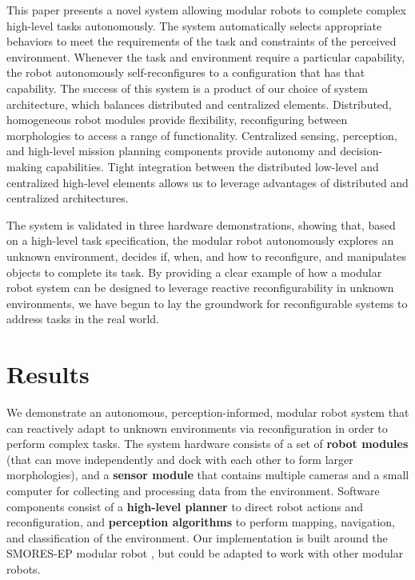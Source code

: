\documentclass[12pt]{article}
\begin{document}
This paper presents a novel system allowing modular robots to complete complex high-level tasks autonomously.  The system automatically selects appropriate behaviors to meet the requirements of the task and constraints of the perceived environment.  Whenever the task and environment require a particular capability, the robot autonomously self-reconfigures to a configuration that has that capability.
The success of this system is a product of our choice of system architecture, which balances distributed and centralized elements.  Distributed, homogeneous robot modules provide flexibility, reconfiguring between morphologies to access a range of functionality.  Centralized sensing, perception, and high-level mission planning components provide autonomy and decision-making capabilities.  Tight integration between the distributed low-level and centralized high-level elements allows us to leverage advantages of distributed and centralized architectures.

The system is validated in three hardware demonstrations, showing that, based on a high-level task specification, the modular robot autonomously explores an unknown environment, decides if, when, and how to reconfigure, and manipulates objects to complete its task. By providing a clear example of how a modular robot system can be designed to leverage reactive reconfigurability in unknown environments, we have begun to lay the groundwork for reconfigurable systems to address tasks in the real world. 

\section{Results}
\label{sec:results}
%
We demonstrate an autonomous, perception-informed, modular robot system that can reactively adapt to unknown environments via reconfiguration in order to perform complex tasks. The system hardware consists of a set of \textbf{robot modules} (that can move independently and dock with each other to form larger morphologies), and a \textbf{sensor module} that contains multiple cameras and a small computer for collecting and processing data from the environment. Software components consist of a \textbf{high-level planner} to direct robot actions and reconfiguration, and \textbf{perception algorithms} to perform mapping, navigation, and classification of the environment.
Our implementation is built around the SMORES-EP modular robot \cite{tosun2016design}, but could be adapted to work with other modular robots.
\end{document}
